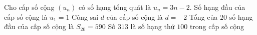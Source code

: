\begin{ex}%
	Cho cấp số cộng $(u_n)$ có số  hạng tổng quát là $u_n=3n-2$.
	\choiceTF 
		{\True Số hạng đầu của  cấp số cộng là $u_1=1$}
		{Công sai $d$ của cấp số cộng là  $d=-2$}
		{\True Tổng  của $20$ số hạng đầu của cấp số cộng là $S_{20}=590$}
		{Số $313$ là số hạng thứ $100$ trong  cấp số cộng}
\end{ex}

